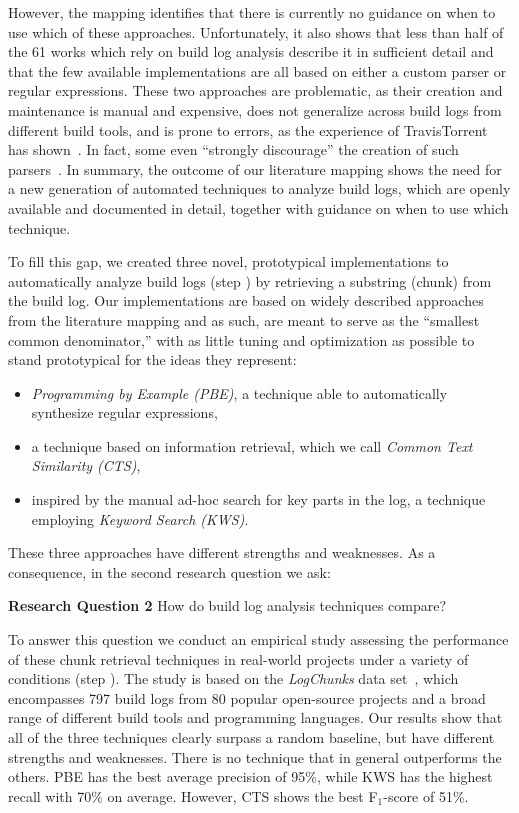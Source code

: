 However, the mapping identifies that there is currently no guidance on when
to use which of these approaches.
Unfortunately, it also shows that
less than half of the 61 works which rely on build log analysis
describe it in sufficient detail and that
the few available implementations are all based on either a custom parser
or regular expressions.
These two approaches are problematic, as their creation
and maintenance is manual and expensive, does not generalize across build
logs from different build tools, and is prone to errors,
as the experience of TravisTorrent has
shown~\citep{beller2017travistorrent}.
In fact, some even ``strongly discourage'' the creation of such
parsers~\citep{urli2018design}.
In summary, the outcome of our literature mapping shows the need for a new
generation of automated techniques to analyze build logs, which are
openly available and documented in detail, together with
guidance on when to use which technique.

To fill this gap, we created three novel, prototypical implementations
to automatically analyze build logs (step ) by retrieving
a substring (chunk) from the build log.
Our
implementations are based on widely described approaches
from the literature mapping and as such, are meant to serve as
the ``smallest common denominator,'' with as little tuning and
optimization as possible to stand prototypical for the ideas
they represent:
\begin{itemize}
	\item \emph{Programming by Example (PBE)}, a technique
	able to
	automatically synthesize regular expressions,
	\item a technique based on information
	retrieval, which we call \emph{Common Text Similarity (CTS)},
	\item inspired by the manual ad-hoc search for key parts in the
	log, a
	technique employing \emph{Keyword Search (KWS)}.
\end{itemize}

These three approaches have
different strengths and weaknesses.
As a consequence,
in the second research question we ask:

\begin{simplebox}[minipage boxed title*=-5cm]{\textbf{Research Question
2}}
How do build log analysis techniques compare?
\end{simplebox}

To answer this question
we conduct an empirical study assessing the performance
of these chunk retrieval techniques in
real-world projects under a variety of conditions (step ).
The study is based on the \emph{LogChunks} data
set~\citep{brandt2020logchunks}, which encompasses 797 build logs from
80 popular open-source projects and a broad range of different
build tools and programming languages.
Our results show that all of the three techniques
clearly surpass a random baseline, but have different strengths and
weaknesses.
There is no technique that in general outperforms
the others.
PBE has the best average precision of 95\%, while KWS has the highest
recall with 70\% on average.
However, CTS shows the best F$_{1}$-score
of 51\%.

